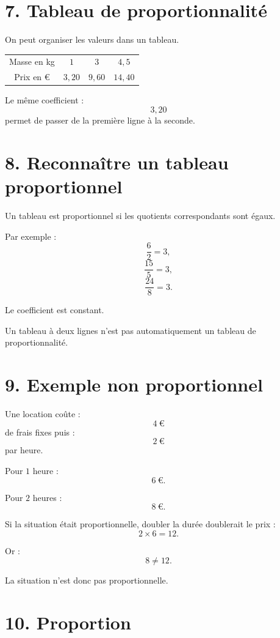 \section{7. Tableau de proportionnalité}

On peut organiser les valeurs dans un tableau.

\begin{tabular}{c|c|c|c}
Masse en kg & $1$ & $3$ & $4{,}5$ \\
Prix en € & $3{,}20$ & $9{,}60$ & $14{,}40$ \\
\end{tabular}

Le même coefficient :
\[
3{,}20
\]
permet de passer de la première ligne à la seconde.

\section{8. Reconnaître un tableau proportionnel}

Un tableau est proportionnel si les quotients correspondants sont égaux.

Par exemple :
\[
\dfrac{6}{2}=3,
\]
\[
\dfrac{15}{5}=3,
\]
\[
\dfrac{24}{8}=3.
\]

Le coefficient est constant.

\begin{attention}
Un tableau à deux lignes n'est pas automatiquement un tableau de proportionnalité.
\end{attention}

\section{9. Exemple non proportionnel}

Une location coûte :
\[
4\ \text{€}
\]
de frais fixes puis :
\[
2\ \text{€}
\]
par heure.

Pour $1$ heure :
\[
6\ \text{€}.
\]

Pour $2$ heures :
\[
8\ \text{€}.
\]

Si la situation était proportionnelle, doubler la durée doublerait le prix :
\[
2\times6=12.
\]

Or :
\[
8\neq12.
\]

La situation n'est donc pas proportionnelle.

\section{10. Proportion}


